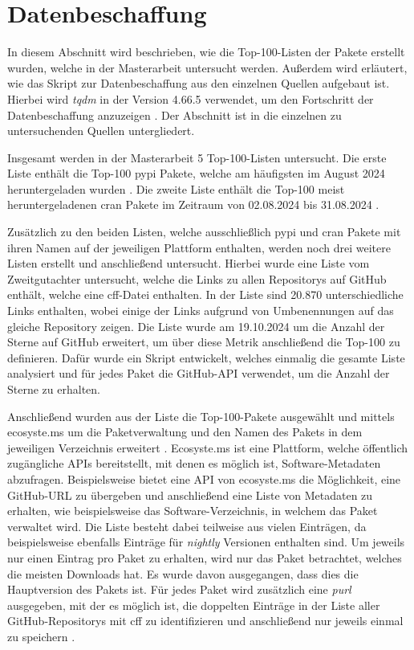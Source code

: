 \section{Datenbeschaffung}
\label{sec:datenbeschaffung}
In diesem Abschnitt wird beschrieben, wie die Top-100-Listen der Pakete erstellt wurden, welche in der Masterarbeit untersucht werden.
Außerdem wird erläutert, wie das Skript zur Datenbeschaffung aus den einzelnen Quellen aufgebaut ist.
Hierbei wird \emph{tqdm} in der Version 4.66.5 verwendet, um den Fortschritt der Datenbeschaffung anzuzeigen \autocite{costa-luis_tqdm_2024}.
Der Abschnitt ist in die einzelnen zu untersuchenden Quellen untergliedert.

Insgesamt werden in der Masterarbeit 5 Top-100-Listen untersucht.
Die erste Liste enthält die Top-100 \gls{pypi} Pakete, welche am häufigsten im August 2024 heruntergeladen wurden \autocite{kemenade_top-pypi-packages_2024}.
Die zweite Liste enthält die Top-100 meist heruntergeladenen \gls{cran} Pakete im Zeitraum von 02.08.2024 bis 31.08.2024 \autocite{csardi_cranlogsapp_2024}.

Zusätzlich zu den beiden Listen, welche ausschließlich \gls{pypi} und \gls{cran} Pakete mit ihren Namen auf der jeweiligen Plattform enthalten, werden noch drei weitere Listen erstellt und anschließend untersucht.
Hierbei wurde eine Liste vom Zweitgutachter untersucht, welche die Links zu allen Repositorys auf GitHub enthält, welche eine \gls{cff}-Datei enthalten.
In der Liste sind 20.870 unterschiedliche Links enthalten, wobei einige der Links aufgrund von Umbenennungen auf das gleiche Repository zeigen.
Die Liste wurde am 19.10.2024 um die Anzahl der Sterne auf GitHub erweitert, um über diese Metrik anschließend die Top-100 zu definieren.
Dafür wurde ein Skript entwickelt, welches einmalig die gesamte Liste analysiert und für jedes Paket die GitHub-API verwendet, um die Anzahl der Sterne zu erhalten.

Anschließend wurden aus der Liste die Top-100-Pakete ausgewählt und mittels ecosyste.ms um die Paketverwaltung und den Namen des Pakets in dem jeweiligen Verzeichnis erweitert \autocite{nesbitt_ecosystems_2024}.
Ecosyste.ms ist eine Plattform, welche öffentlich zugängliche APIs bereitstellt, mit denen es möglich ist, Software-Metadaten abzufragen.
Beispielsweise bietet eine API von ecosyste.ms die Möglichkeit, eine GitHub-URL zu übergeben und anschließend eine Liste von Metadaten zu erhalten, wie beispielsweise das Software-Verzeichnis, in welchem das Paket verwaltet wird.
Die Liste besteht dabei teilweise aus vielen Einträgen, da beispielsweise ebenfalls Einträge für \emph{nightly} Versionen enthalten sind.
Um jeweils nur einen Eintrag pro Paket zu erhalten, wird nur das Paket betrachtet, welches die meisten Downloads hat.
Es wurde davon ausgegangen, dass dies die Hauptversion des Pakets ist.
Für jedes Paket wird zusätzlich eine \emph{purl} ausgegeben, mit der es möglich ist, die doppelten Einträge in der Liste aller GitHub-Repositorys mit \gls{cff} zu identifizieren und anschließend nur jeweils einmal zu speichern \autocites{ombredanne_purl-spec_2024}{nesbitt_ecosystems_2024}.

